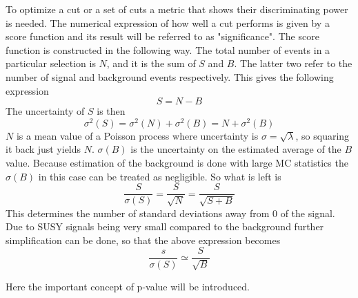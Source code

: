 To optimize a cut or a set of cuts a metric that shows their discriminating power is needed. The numerical expression of how well a cut performs is given by a score function and its result will be referred to as "significance". The score function is constructed in the following way.
The total number of events in a particular selection is $N$, and it is the sum of $S$ and $B$. The latter two refer to the number of signal and background events respectively. This gives the following expression
\begin{equation}
S = N -B
\end{equation}
The uncertainty of $S$ is then
\begin{equation}
\sigma^2(S) = \sigma^2(N) + \sigma^2(B) = N+\sigma^2(B)
\end{equation}
$N$ is a mean value of a Poisson process where uncertainty is $\sigma = \sqrt{\lambda}$, so squaring it back just yields $N$. 
$\sigma(B)$ is the uncertainty on the estimated average of the $B$ value. 
Because estimation of the background is done with large MC statistics the $\sigma(B)$ in this case can be treated as negligible. So what is left is
\begin{equation}
\frac{S}{\sigma(S)} = \frac{S}{\sqrt{N}} = \frac{S}{\sqrt{S+B}}
\end{equation}
This determines the number of standard deviations away from 0 of the signal. Due to SUSY signals being very small compared to the background further simplification can be done, so that the above expression becomes
\begin{equation}
\frac{s}{\sigma(S)}\simeq \frac{S}{\sqrt{B}}
\end{equation} 

Here the important concept of p-value will be introduced. 
 
